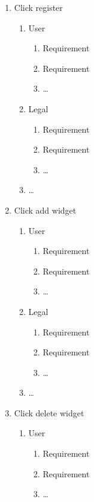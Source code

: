 \documentclass[]{article}
\begin{document}
\begin{enumerate}[{BE}1.]
\begin{enumerate}[{VP2}.1]
\begin{enumerate}
      \end{enumerate}
    \item \dots
  \end{enumerate}
  \item Click register
  \begin{enumerate}[{VP1}.1]
    \item User
      \begin{enumerate}
        \item Requirement
        \item Requirement
        \item \dots
      \end{enumerate}
    \item Legal
      \begin{enumerate}
        \item Requirement
        \item Requirement
        \item \dots
      \end{enumerate}
    \item \dots
  \end{enumerate}
  \item Click add widget
  \begin{enumerate}[{VP1}.1]
    \item User
      \begin{enumerate}
        \item Requirement
        \item Requirement
        \item \dots
      \end{enumerate}
    \item Legal
      \begin{enumerate}
        \item Requirement
        \item Requirement
        \item \dots
      \end{enumerate}
    \item \dots
  \end{enumerate}
  \item Click delete widget
  \begin{enumerate}[{VP1}.1]
    \item User
      \begin{enumerate}
        \item Requirement
        \item Requirement
        \item \dots

\end{enumerate}
\end{enumerate}
\end{enumerate}
\end{document}
